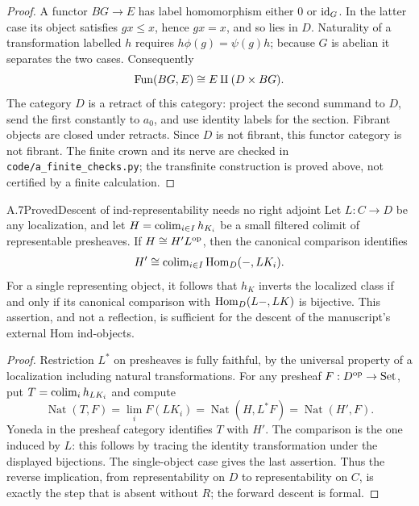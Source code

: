 \begin{proof}
A functor $BG\to E$ has label homomorphism either $0$ or $\mathrm{id}_G$. In the latter case its object satisfies $gx\leq x$, hence $gx=x$, and so lies in $D$. Naturality of a transformation labelled $h$ requires $h\phi(g)=\psi(g)h$; because $G$ is abelian it separates the two cases. Consequently
\[
 \operatorname{Fun}(BG,E)\cong E\amalg(D\times BG).
\]
The category $D$ is a retract of this category: project the second summand to $D$, send the first constantly to $a_0$, and use identity labels for the section. Fibrant objects are closed under retracts. Since $D$ is not fibrant, this functor category is not fibrant. The finite crown and its nerve are checked in \texttt{code/a\_finite\_checks.py}; the transfinite construction is proved above, not certified by a finite calculation.
\end{proof}

\begin{claim}{A.7}{Proved}{Descent of ind-representability needs no right adjoint}
Let $L:C\to D$ be any localization, and let $H=\operatorname{colim}_{i\in I}h_{K_i}$ be a small filtered colimit of representable presheaves. If $H\cong H' L^{\mathrm{op}}$, then the canonical comparison identifies
\[
 H'\cong\operatorname{colim}_{i\in I}\operatorname{Hom}_D(-,LK_i).
\]
For a single representing object, it follows that $h_K$ inverts the localized class if and only if its canonical comparison with $\operatorname{Hom}_D(L-,LK)$ is bijective. This assertion, and not a reflection, is sufficient for the descent of the manuscript's external Hom ind-objects.
\end{claim}
\begin{proof}
Restriction $L^*$ on presheaves is fully faithful, by the universal property of a localization including natural transformations. For any presheaf $F:D^{\mathrm{op}}\to\mathrm{Set}$, put $T=\operatorname{colim}_i h_{LK_i}$ and compute
\[
 \operatorname{Nat}(T,F)=\lim_iF(LK_i)
 =\operatorname{Nat}(H,L^*F)
 =\operatorname{Nat}(H',F).
\]
Yoneda in the presheaf category identifies $T$ with $H'$. The comparison is the one induced by $L$: this follows by tracing the identity transformation under the displayed bijections. The single-object case gives the last assertion. Thus the reverse implication, from representability on $D$ to representability on $C$, is exactly the step that is absent without $R$; the forward descent is formal.
\end{proof}
